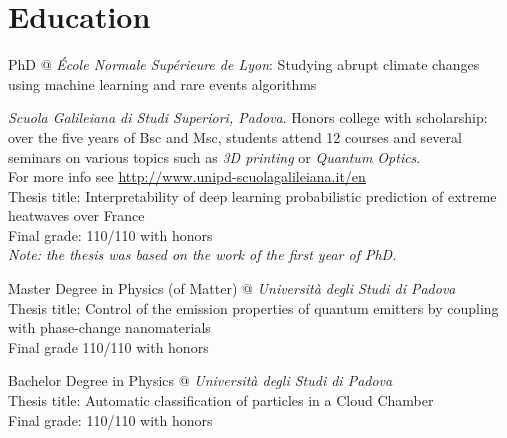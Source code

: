 \documentclass[11pt, a4 paper]{article}
\begin{document}
\section*{Education}
  \begin{description}[style=multiline,leftmargin=3cm,align=right]
    \item[2021-present]
      PhD @ \emph{\'Ecole Normale Supérieure de Lyon}: Studying abrupt climate changes using machine learning and rare
events algorithms
    \item[2016-2022]
      \emph{Scuola Galileiana di Studi Superiori, Padova}. Honors college with scholarship: over the five years of Bsc and Msc, students attend 12 courses and several seminars on various topics such as \emph{3D printing} or \emph{Quantum Optics}. \\ For more info see \url{http://www.unipd-scuolagalileiana.it/en} \\
      Thesis title: Interpretability of deep learning probabilistic prediction of extreme heatwaves over France \\
      Final grade: 110/110 with honors \\
      \emph{Note: the thesis was based on the work of the first year of PhD.}
    \item[2019-2021]
      Master Degree in Physics (of Matter) @ \emph{Università degli Studi di Padova} \\
      Thesis title: Control of the emission properties of quantum emitters by coupling with phase-change nanomaterials \\
      Final grade 110/110 with honors
    \item[2016-2019]
      Bachelor Degree in Physics @ \emph{Università degli Studi di Padova} \\
      Thesis title: Automatic classification of particles in a Cloud Chamber \\
      Final grade: 110/110 with honors
  \end{description}


\end{document}

